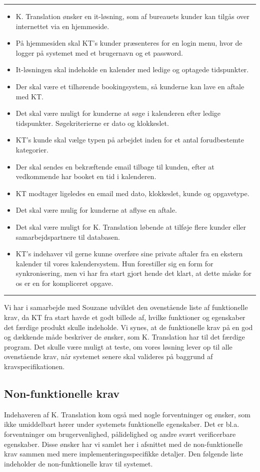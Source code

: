 \documentclass[12pt]{article}   %
\begin{document}
\rule{120mm}{1mm}
\begin{itemize}
\item K. Translation ønsker en it-løsning, som af bureauets kunder kan tilgås over internettet via en hjemmeside.
\item På hjemmesiden skal KT's kunder præsenteres for en login menu, hvor de logger på systemet med et brugernavn og et password.
\item It-løsningen skal indeholde en kalender med ledige og optagede tidspunkter.
\item Der skal være et tilhørende bookingsystem, så kunderne kan lave en aftale med KT.  
\item Det skal være muligt for kunderne at søge i kalenderen efter ledige tidspunkter. Søgekriterierne er dato og klokkeslet. 
\item KT's kunde skal vælge typen på arbejdet inden for et antal forudbestemte kategorier.
\item Der skal sendes en bekræftende email tilbage til kunden, efter at vedkommende har booket en tid i kalenderen. 
\item KT modtager ligeledes en email med dato, klokkeslet, kunde og opgavetype.
\item Det skal være mulig for kunderne at aflyse en aftale.
\item Det skal være muligt for K. Translation løbende at tilføje flere kunder eller samarbejdspartnere til databasen. 
\item KT's indehaver vil gerne kunne overføre sine private aftaler fra en ekstern kalender til vores kalendersystem. Hun forestiller sig en form for synkronisering, men vi har fra start gjort hende det klart, at dette måske for os er en for kompliceret opgave. 
\end{itemize}
\rule{120mm}{1mm}
\vspace{0.5cm}

Vi har i samarbejde med Souzane udviklet den ovenstående liste af funktionelle krav, da KT fra start havde et godt billede af, hvilke funktioner og egenskaber det færdige produkt skulle indeholde. Vi synes, at de funktionelle krav på en god og dækkende måde beskriver de ønsker, som K. Translation har til det færdige program. Det skulle være muligt at teste, om vores løsning lever op til alle ovenstående krav, når systemet senere skal valideres på baggrund af kravspecifikationen.  \\ 


\subsection{Non-funktionelle krav}
Indehaveren af K. Translation kom også med nogle forventninger og ønsker, som ikke umiddelbart hører under systemets funktionelle egenskaber. Det er bl.a. forventninger om brugervenlighed, pålidelighed og andre svært verificerbare
egenskaber. Disse ønsker har vi samlet her i afsnittet med de non-funktionelle krav sammen med mere  implementeringsspecifikke detaljer. Den følgende liste
indeholder de non-funktionelle krav til systemet.\\
\end{document}
